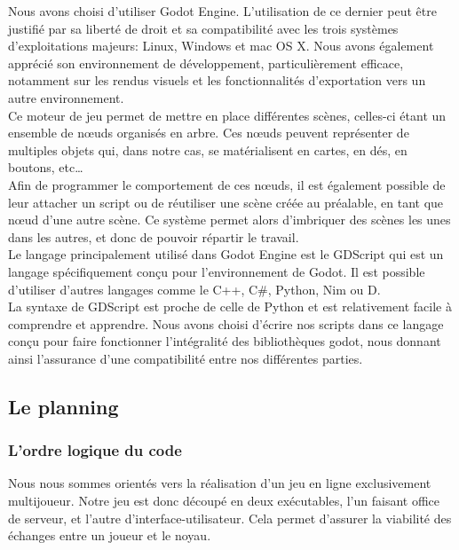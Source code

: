\documentclass[a4paper,11pt]{article}
\begin{document}
Nous avons choisi d’utiliser Godot Engine. L’utilisation de ce dernier peut être justifié par sa liberté de droit et sa compatibilité avec les trois systèmes d’exploitations majeurs: Linux, Windows et mac OS X. Nous avons également apprécié son environnement de développement, particulièrement efficace, notamment sur les rendus visuels et les fonctionnalités d’exportation vers un autre environnement. \\

Ce moteur de jeu permet de mettre en place différentes scènes, celles-ci étant un ensemble de nœuds organisés en arbre. Ces nœuds peuvent représenter de multiples objets qui, dans notre cas, se matérialisent en cartes, en dés, en boutons, etc… \\

Afin de programmer le comportement de ces nœuds, il est également possible de leur attacher un script ou de réutiliser une scène créée au préalable, en tant que nœud d’une autre scène. Ce système permet alors d’imbriquer des scènes les unes dans les autres, et donc de pouvoir répartir le travail. \\

Le langage principalement utilisé dans Godot Engine est le GDScript  qui est un langage spécifiquement conçu pour l’environnement de Godot. Il est possible d’utiliser d’autres langages comme le C++, C\#, Python, Nim ou D. \\
 
La syntaxe de GDScript est proche de celle de Python et est relativement facile à comprendre et apprendre. Nous avons choisi d’écrire nos scripts dans ce langage conçu pour faire fonctionner l’intégralité des bibliothèques godot, nous donnant ainsi l’assurance d’une compatibilité entre nos différentes parties. 


\subsection{Le planning}
\subsubsection{L'ordre logique du code}

Nous nous sommes orientés vers la réalisation d’un jeu en ligne exclusivement multijoueur. Notre jeu est donc découpé en deux exécutables, l’un faisant office de serveur, et l’autre d’interface-utilisateur. Cela permet d’assurer la viabilité des échanges entre un joueur et le noyau. 
\end{document}
